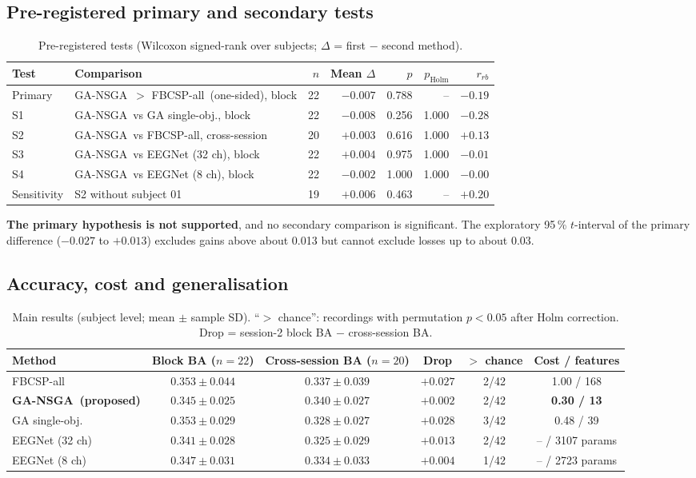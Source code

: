 \documentclass[11pt,a4paper]{article}
\newcommand{\ga}{GA-NSGA}
\newcommand{\gas}{GA single-obj.}
\newcommand{\fb}{FBCSP-all}
\begin{document}
\subsection{Pre-registered primary and secondary tests}
\begin{table}[H]
\centering\small
\caption{Pre-registered tests (Wilcoxon signed-rank over subjects; $\Delta$ = first $-$ second method).}
\label{tab:tests}
\begin{tabular}{@{}llrrrrr@{}}
\toprule
Test & Comparison & $n$ & Mean $\Delta$ & $p$ & $p_{\text{Holm}}$ & $r_{rb}$ \\
\midrule
Primary & \ga\ $>$ \fb\ (one-sided), block & 22 & $-0.007$ & 0.788 & -- & $-0.19$ \\
S1 & \ga\ vs \gas, block & 22 & $-0.008$ & 0.256 & 1.000 & $-0.28$ \\
S2 & \ga\ vs \fb, cross-session & 20 & $+0.003$ & 0.616 & 1.000 & $+0.13$ \\
S3 & \ga\ vs EEGNet (32 ch), block & 22 & $+0.004$ & 0.975 & 1.000 & $-0.01$ \\
S4 & \ga\ vs EEGNet (8 ch), block & 22 & $-0.002$ & 1.000 & 1.000 & $-0.00$ \\
\midrule
Sensitivity & S2 without subject 01 & 19 & $+0.006$ & 0.463 & -- & $+0.20$ \\
\bottomrule
\end{tabular}
\end{table}

\noindent\textbf{The primary hypothesis is not supported}, and no secondary comparison is significant.
The exploratory 95\,\% $t$-interval of the primary difference ($-0.027$ to $+0.013$) excludes gains
above about 0.013 but cannot exclude losses up to about 0.03.

\subsection{Accuracy, cost and generalisation}
\begin{table}[H]
\centering\small
\caption{Main results (subject level; mean $\pm$ sample SD). ``$>$ chance'': recordings with permutation
$p<0.05$ after Holm correction. Drop = session-2 block BA $-$ cross-session BA.}
\label{tab:main}
\begin{tabular}{@{}lccccc@{}}
\toprule
Method & Block BA ($n=22$) & Cross-session BA ($n=20$) & Drop & $>$ chance & Cost / features \\
\midrule
\fb & $0.353\pm0.044$ & $0.337\pm0.039$ & $+0.027$ & 2/42 & 1.00 / 168 \\
\textbf{\ga\ (proposed)} & $0.345\pm0.025$ & $0.340\pm0.027$ & $+0.002$ & 2/42 & \textbf{0.30 / 13} \\
\gas & $0.353\pm0.029$ & $0.328\pm0.027$ & $+0.028$ & 3/42 & 0.48 / 39 \\
EEGNet (32 ch) & $0.341\pm0.028$ & $0.325\pm0.029$ & $+0.013$ & 2/42 & -- / 3107 params \\
EEGNet (8 ch) & $0.347\pm0.031$ & $0.334\pm0.033$ & $+0.004$ & 1/42 & -- / 2723 params \\
\bottomrule
\end{tabular}
\end{table}
\end{document}
